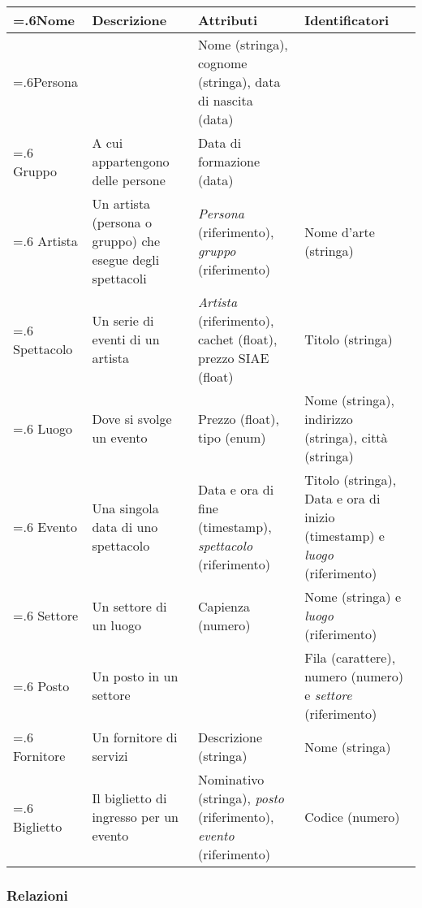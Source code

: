 \documentclass[a4paper,11pt]{article}
\begin{document}
\begin{tabularx}{\textwidth}{|>{\hsize=.6\hsize}X|>{\raggedright\arraybackslash}X|>{\raggedright\arraybackslash\hsize=1.4\hsize}X|>{\raggedright\arraybackslash}X|}
\hline
\textbf{Nome} & \textbf{Descrizione} & \textbf{Attributi} & \textbf{Identificatori}\\
\hline
Persona & & Nome (stringa), cognome (stringa), data di nascita (data) &\\
\hline
Gruppo & A cui appartengono delle persone & Data di formazione (data) &\\
\hline
Artista & Un artista (persona o gruppo) che esegue degli spettacoli & \textit{Persona} (riferimento), \textit{gruppo} (riferimento) & Nome d'arte (stringa)\\
\hline
Spettacolo & Un serie di eventi di un artista & \textit{Artista} (riferimento), cachet (float), prezzo SIAE (float) & Titolo (stringa)\\
\hline
Luogo & Dove si svolge un evento & Prezzo (float), tipo (enum) & Nome (stringa), indirizzo (stringa), città (stringa)\\
\hline
Evento & Una singola data di uno spettacolo & Data e ora di fine (timestamp), \textit{spettacolo} (riferimento) & Titolo (stringa), Data e ora di inizio (timestamp) e \textit{luogo} (riferimento)\\
\hline
Settore & Un settore di un luogo & Capienza (numero) & Nome (stringa) e \textit{luogo} (riferimento)\\
\hline
Posto & Un posto in un settore & & Fila (carattere), numero (numero) e \textit{settore} (riferimento)\\
\hline
Fornitore & Un fornitore di servizi & Descrizione (stringa) & Nome (stringa)\\
\hline
Biglietto & Il biglietto di ingresso per un evento & Nominativo (stringa), \textit{posto} (riferimento), \textit{evento} (riferimento) & Codice (numero)\\
\hline
\end{tabularx}

\subsubsection*{Relazioni}
\end{document}
